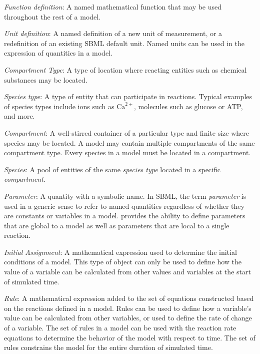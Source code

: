 \begin{description}
  
\item \emph{Function definition}: A named mathematical function
  that may be used throughout the rest of a model.

\item \emph{Unit definition}: A named definition of a new
  unit of measurement, or a redefinition of an existing SBML default
  unit.  Named units can be used in the expression of quantities
  in a model.

\item \emph{Compartment Type}: A type of location where
  reacting entities such as chemical substances may be located.

\item \emph{Species type}: A type of entity
  that can participate in reactions.  Typical examples of species types
  include ions such as $\text{Ca}^{2+}$, molecules such as
  glucose or ATP, and more.

\item \emph{Compartment}: A well-stirred container of a
  particular type and finite size where species may be located.
  A model may contain multiple compartments of the same
  compartment type.  Every species in a model must be located in
  a compartment.

\item \emph{Species}: A pool of entities of the same
  \emph{species type} located in a specific \emph{compartment}.

\item \emph{Parameter}: A quantity with a symbolic name.
  In SBML, the term \emph{parameter} is used in a generic sense
  to refer to named quantities regardless of whether they are
  constants or variables in a model.  \sbmltwo provides the
  ability to define parameters that are global to a model as
  well as parameters that are local to a single reaction.
  
\item \emph{Initial Assignment}: A mathematical
  expression used to determine the initial conditions of a
  model.  This type of object can only be used to define how
  the value of a variable can be calculated from other values
  and variables at the start of simulated time.
  
\item \emph{Rule}: A mathematical expression added to the set of
  equations constructed based on the reactions defined in a model.
  Rules can be used to define how a variable's value can
  be calculated from other variables, or used to define the rate
  of change of a variable.  The set of rules in a model can be
  used with the reaction rate equations to determine the
  behavior of the model with respect to time.  The set of rules
  constrains the model for the entire duration of simulated
  time.


\end{description}
